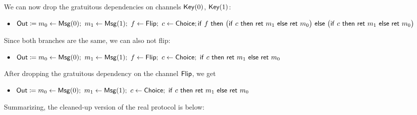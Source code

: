 We can now drop the gratuitous dependencies on channels $\mathsf{Key}(0)$, $\mathsf{Key}(1)$:
\begin{itemize}
\item $\mathsf{Out} \coloneqq m_0 \leftarrow \mathsf{Msg}(0); \ m_1 \leftarrow \mathsf{Msg}(1); \ f \leftarrow \mathsf{Flip}; \ c \leftarrow \mathsf{Choice}; \\ \mathsf{if} \ f \ \mathsf{then} \ \big(\mathsf{if} \ c \ \mathsf{then} \ \mathsf{ret} \ m_1 \ \mathsf{else} \ \mathsf{ret} \ m_0\big) \ \mathsf{else} \ \big(\mathsf{if} \ c \ \mathsf{then} \ \mathsf{ret} \ m_1 \ \mathsf{else} \ \mathsf{ret} \ m_0\big)$
\end{itemize}
Since both branches are the same, we can also not flip:
\begin{itemize}
\item $\mathsf{Out} \coloneqq m_0 \leftarrow \mathsf{Msg}(0); \ m_1 \leftarrow \mathsf{Msg}(1); \ f \leftarrow \mathsf{Flip}; \ c \leftarrow \mathsf{Choice}; \ \mathsf{if} \ c \ \mathsf{then} \ \mathsf{ret} \ m_1 \ \mathsf{else} \ \mathsf{ret} \ m_0$
\end{itemize}
After dropping the gratuitous dependency on the channel $\mathsf{Flip}$, we get
\begin{itemize}
\item $\Out \coloneqq m_0 \leftarrow \Msg(0); \ m_1 \leftarrow \Msg(1); \ c \leftarrow \Choice; \ \ifte{c}{\ret{m_1}}{\ret{m_0}}$
\end{itemize}
Summarizing, the cleaned-up version of the real protocol is below:

